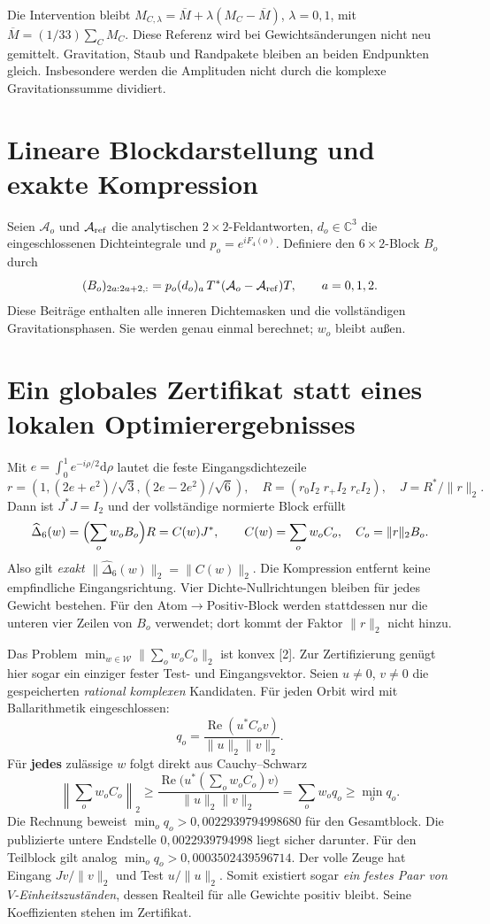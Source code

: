 \documentclass[10pt,a4paper]{article}
\newcommand{\A}{\mathcal A}\newcommand{\D}{\mathcal D}\newcommand{\one}{\mathbf1}
\newcommand{\W}{\mathcal W}\newcommand{\dd}{\mathrm d}
\begin{document}
Die Intervention bleibt $M_{C,\lambda}=\overline M+\lambda(M_C-\overline M)$,
$\lambda=0,1$, mit $\overline M=(1/33)\sum_C M_C$. Diese Referenz wird bei
Gewichtsänderungen nicht neu gemittelt. Gravitation, Staub und Randpakete
bleiben an beiden Endpunkten gleich. Insbesondere werden die Amplituden
nicht durch die komplexe Gravitationssumme dividiert.

\section{Lineare Blockdarstellung und exakte Kompression}
Seien $\A_o$ und $\A_{\rm ref}$ die analytischen $2\times2$-Feldantworten,
$d_o\in\mathbb C^3$ die eingeschlossenen Dichteintegrale und
$p_o=e^{iF_4(o)}$. Definiere den $6\times2$-Block $B_o$ durch
\[
 (B_o)_{2a:2a+2,:}=p_o(d_o)_a\,T^*(\A_o-\A_{\rm ref})T,\qquad a=0,1,2.
\]
Diese Beiträge enthalten alle inneren Dichtemasken und die vollständigen
Gravitationsphasen. Sie werden genau einmal berechnet; $w_o$ bleibt außen.

\newpage
\section{Ein globales Zertifikat statt eines lokalen Optimierergebnisses}
Mit $e=\int_0^1e^{-i\rho/2}\dd\rho$ lautet die feste Eingangsdichtezeile
\[
 r=(1,(2e+e^2)/\sqrt3,(2e-2e^2)/\sqrt6),\quad
 R=(r_0 I_2\;r_+ I_2\;r_c I_2),\quad J=R^*/\|r\|_2.
\]
Dann ist $J^*J=I_2$ und der vollständige normierte Block erfüllt
\[
 \widehat\Delta_6(w)=\Bigl(\sum_o w_oB_o\Bigr)R
 =C(w)J^*,\qquad C(w)=\sum_o w_oC_o,\quad C_o=\|r\|_2B_o.
\]
Also gilt \emph{exakt} $\|\widehat\Delta_6(w)\|_2=\|C(w)\|_2$.
Die Kompression entfernt keine empfindliche Eingangsrichtung. Vier
Dichte-Nullrichtungen bleiben für jedes Gewicht bestehen. Für den
Atom$\to$Positiv-Block werden stattdessen nur die unteren vier Zeilen von
$B_o$ verwendet; dort kommt der Faktor $\|r\|_2$ nicht hinzu.

Das Problem $\min_{w\in\W}\|\sum_o w_oC_o\|_2$ ist konvex [2]. Zur
Zertifizierung genügt hier sogar ein einziger fester Test- und Eingangsvektor.
Seien $u\ne0$, $v\ne0$ die gespeicherten \emph{rational komplexen}
Kandidaten. Für jeden Orbit wird mit Ballarithmetik eingeschlossen:
\[
 q_o=\frac{\operatorname{Re}(u^*C_ov)}{\|u\|_2\|v\|_2}.
\]
Für \textbf{jedes} zulässige $w$ folgt direkt aus Cauchy--Schwarz
\[
 \left\|\sum_o w_oC_o\right\|_2
 \geq\frac{\operatorname{Re}\bigl(u^*(\sum_o w_oC_o)v\bigr)}{\|u\|_2\|v\|_2}
 =\sum_o w_oq_o\geq\min_o q_o.
\]
Die Rechnung beweist $\min_o q_o>0{,}0022939794998680$ für den Gesamtblock.
Die publizierte untere Endstelle $0{,}0022939794998$ liegt sicher darunter.
Für den Teilblock gilt analog $\min_o q_o>0{,}0003502439596714$.
Der volle Zeuge hat Eingang $Jv/\|v\|_2$ und Test $u/\|u\|_2$. Somit
existiert sogar \emph{ein festes Paar von $V$-Einheitszuständen}, dessen
Realteil für alle Gewichte positiv bleibt. Seine Koeffizienten stehen im Zertifikat.
\end{document}
